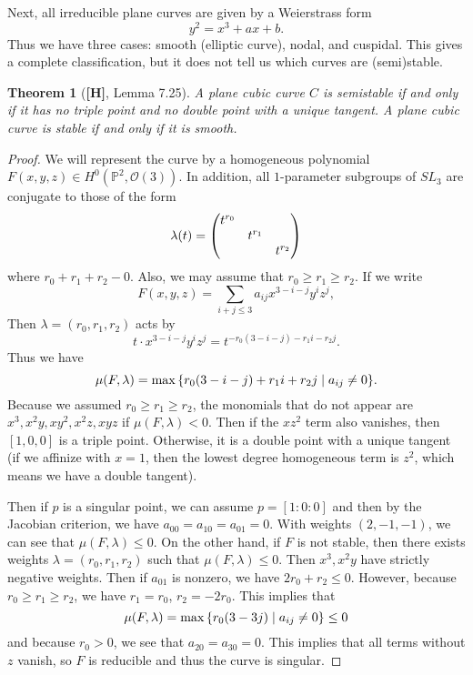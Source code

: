 \documentclass[leqno, openany]{memoir}
\newtheorem{thm}{Theorem}[section]
\theoremstyle{definition}
\theoremstyle{remark}
\theoremstyle{plain}
\theoremstyle{definition}
\theoremstyle{remark}
\renewcommand{\P}{\mathbb{P}}
\newcommand{\mc}[1]{\mathcal{#1}}
\begin{document}
Next, all irreducible plane curves are given by a Weierstrass form \[ y^2 = x^3
+ ax + b. \] Thus we have three cases: smooth (elliptic curve), nodal, and
cuspidal. This gives a complete classification, but it does not tell us which
curves are (semi)stable.

\begin{thm}[\textbf{[H]}, Lemma 7.25] A plane cubic curve $C$ is semistable if
and only if it has no triple point and no double point with a unique tangent. A
plane cubic curve is stable if and only if it is smooth.  \end{thm}

\begin{proof} We will represent the curve by a homogeneous polynomial $F(x,y,z)
    \in H^0(\P^2, \mc{O}(3))$. In addition, all $1$-parameter subgroups of
    $SL_3$ are conjugate to those of the form \[ \lambda(t) =
    \mqty(\dmat{t^{r_0}, t^{r_1}, t^{r_2}}) \] where $r_0 + r_1 + r_2 - 0$.
    Also, we may assume that $r_0 \geq r_1 \geq r_2$. If we write \[ F(x,y,z) =
    \sum_{i+j \leq 3} a_{ij} x^{3-i-j} y^i z^j, \] Then $\lambda = (r_0, r_1,
    r_2)$ acts by \[ t \cdot x^{3-i-j} y^i z^j = t^{-r_0(3-i-j) - r_1 i - r_2
        j}. \] Thus we have \[ \mu(F, \lambda) = \max \qty{ r_0(3-i-j) + r_1 i
+ r_2 j \mid a_{ij} \neq 0 }. \] Because we assumed $r_0 \geq r_1 \geq r_2$,
the monomials that do not appear are $x^3, x^2 y, xy^2, x^2 z, xyz$ if $\mu(F,
\lambda) < 0$. Then if the $xz^2$ term also vanishes, then $[1,0,0]$ is a
triple point. Otherwise, it is a double point with a unique tangent (if we
affinize with $x = 1$, then the lowest degree homogeneous term is $z^2$, which
means we have a double tangent).

    Then if $p$ is a singular point, we can assume $p = [1:0:0]$ and then by
    the Jacobian criterion, we have $a_{00} = a_{10} = a_{01} = 0$. With
    weights $(2,-1,-1)$, we can see that $\mu(F, \lambda) \leq 0$. On the other
    hand, if $F$ is not stable, then there exists weights $\lambda = (r_0, r_1,
    r_2)$ such that $\mu(F, \lambda) \leq 0$. Then $x^3, x^2y$ have strictly
    negative weights. Then if $a_{01}$ is nonzero, we have $2r_0 + r_2 \leq 0$.
    However, because $r_0 \geq r_1 \geq r_2$, we have $r_1 = r_0$, $r_2 =
    -2r_0$. This implies that \[ \mu(F, \lambda) = \max \qty{r_0(3-3j) \mid
    a_{ij} \neq 0} \leq 0 \] and because $r_0 > 0$, we see that $a_{20} =
a_{30} = 0$. This implies that all terms without $z$ vanish, so $F$ is
reducible and thus the curve is singular.  \end{proof}
\end{document}

